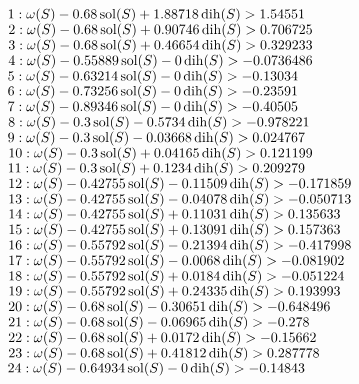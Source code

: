 $1:  \omega(S) - 0.68 \operatorname{sol}(S) + 1.88718 \operatorname{dih}(S) > 1.54551 $\newline
$2:  \omega(S) - 0.68 \operatorname{sol}(S) + 0.90746 \operatorname{dih}(S) > 0.706725$\newline
$3:  \omega(S) - 0.68 \operatorname{sol}(S) + 0.46654 \operatorname{dih}(S) > 0.329233$\newline
$4:  \omega(S) - 0.55889 \operatorname{sol}(S) - 0 \operatorname{dih}(S) > -0.0736486$\newline
$5:  \omega(S) - 0.63214 \operatorname{sol}(S) - 0 \operatorname{dih}(S) > -0.13034$\newline
$6:  \omega(S) - 0.73256 \operatorname{sol}(S) - 0 \operatorname{dih}(S) > -0.23591$\newline
$7:  \omega(S) - 0.89346 \operatorname{sol}(S) - 0 \operatorname{dih}(S) > -0.40505$\newline
$8:  \omega(S) - 0.3 \operatorname{sol}(S) - 0.5734 \operatorname{dih}(S) > -0.978221$\newline
$9:  \omega(S) - 0.3 \operatorname{sol}(S) - 0.03668 \operatorname{dih}(S) > 0.024767$\newline
$10:  \omega(S) - 0.3 \operatorname{sol}(S) + 0.04165 \operatorname{dih}(S) > 0.121199$\newline
$11:  \omega(S) - 0.3 \operatorname{sol}(S) + 0.1234 \operatorname{dih}(S) > 0.209279$\newline
$12:  \omega(S) - 0.42755 \operatorname{sol}(S) - 0.11509 \operatorname{dih}(S) > -0.171859$\newline
$13:  \omega(S) - 0.42755 \operatorname{sol}(S) - 0.04078 \operatorname{dih}(S) > -0.050713$\newline
$14:  \omega(S) - 0.42755 \operatorname{sol}(S) + 0.11031 \operatorname{dih}(S) > 0.135633$\newline
$15:  \omega(S) - 0.42755 \operatorname{sol}(S) + 0.13091 \operatorname{dih}(S) > 0.157363$\newline
$16:  \omega(S) - 0.55792 \operatorname{sol}(S) - 0.21394 \operatorname{dih}(S) > -0.417998$\newline
$17:  \omega(S) - 0.55792 \operatorname{sol}(S) - 0.0068 \operatorname{dih}(S) > -0.081902$\newline
$18:  \omega(S) - 0.55792 \operatorname{sol}(S) + 0.0184 \operatorname{dih}(S) > -0.051224$\newline
$19:  \omega(S) - 0.55792 \operatorname{sol}(S) + 0.24335 \operatorname{dih}(S) > 0.193993$\newline
$20:  \omega(S) - 0.68 \operatorname{sol}(S) - 0.30651 \operatorname{dih}(S) > -0.648496$\newline
$21:  \omega(S) - 0.68 \operatorname{sol}(S) - 0.06965 \operatorname{dih}(S) > -0.278$\newline
$22:  \omega(S) - 0.68 \operatorname{sol}(S) + 0.0172 \operatorname{dih}(S) > -0.15662$\newline
$23:  \omega(S) - 0.68 \operatorname{sol}(S) + 0.41812 \operatorname{dih}(S) > 0.287778$\newline
$24:  \omega(S) - 0.64934 \operatorname{sol}(S) - 0 \operatorname{dih}(S) > -0.14843$\newline
